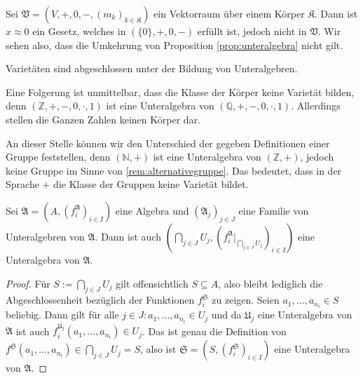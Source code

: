 \begin{remark}
    Sei $\mathfrak{V}=(V,+,0,-,(m_k)_{k\in\mathfrak{K}})$ ein Vektorraum über einem Körper $\mathfrak{K}$.
    Dann ist $x\approx 0$ ein Gesetz, welches in $(\{0\},+,0,-)$ erfüllt ist, jedoch nicht in $\mathfrak{V}$.
    Wir sehen also, dass die Umkehrung von Proposition \ref{prop:unteralgebra} nicht gilt.
\end{remark}

\begin{corollary}
    Varietäten sind abgeschlossen unter der Bildung von Unteralgebren.
\end{corollary}

\begin{remark}
    Eine Folgerung ist unmittelbar, dass die Klasse der Körper keine Varietät bilden,
    denn $(\mathbb{Z},+,-,0,\cdot,1)$ ist eine Unteralgebra von $(\mathbb{Q},+,-,0,\cdot,1)$.
    Allerdings stellen die Ganzen Zahlen keinen Körper dar.
\end{remark}

\begin{remark}
    An dieser Stelle können wir den Unterschied der gegeben Definitionen einer Gruppe feststellen,
    denn $(\mathbb{N},+)$ ist eine Unteralgebra von $(\mathbb{Z},+)$, jedoch keine Gruppe im Sinne von 
    \ref{rem:alternativegruppe}. Das bedeutet, dass in der Sprache $+$ die Klasse der Gruppen keine Varietät bildet.
\end{remark}

\begin{proposition}
    Sei $\mathfrak{A}=(A,(f^\mathfrak{A}_i)_{i\in I})$ eine Algebra und $(\mathfrak{A}_j)_{j\in J}$ eine Familie von Unteralgebren
    von $\mathfrak{A}$. Dann ist auch $(\bigcap_{j\in J}U_j,(f^\mathfrak{A}_i\vert_{\bigcap_{j\in J}U_j})_{i\in I})$ eine Unteralgebra von $\mathfrak{A}$.
\end{proposition}

\begin{proof}
    Für $S:=\bigcap_{j\in J}U_j$ gilt offensichtlich $S\subseteq A$, also bleibt lediglich die Abgeschlossenheit bezüglich
    der Funktionen $f^\mathfrak{S}_i$ zu zeigen. Seien $a_1,\ldots,a_{n_i}\in S$ beliebig. Dann gilt für alle
    $j\in J:a_1,\ldots,a_{n_i}\in U_j$ und da $\mathfrak{U}_j$ eine Unteralgebra von $\mathfrak{A}$ ist auch $f^{\mathfrak{U}_j}_i(a_1,\ldots,a_{n_i})\in U_j$.
    Das ist genau die Definition von $f^\mathfrak{S}(a_1,\ldots,a_{n_i})\in \bigcap_{j\in J}U_j=S$, also ist $\mathfrak{S}=(S,(f^\mathfrak{S}_i)_{i\in I})$ eine Unteralgebra von $\mathfrak{A}$.
\end{proof}

